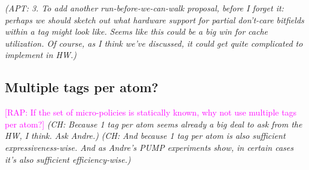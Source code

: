 \documentclass{article}
\newcommand{\comm}[3]{\textcolor{#1}{[#2: #3]}}
\newcommand{\ch}[1]{{\color{dkblue}\em (CH: #1)}}
\newcommand{\apt}[1]{{\color{red}\em (APT: #1)}}
\newcommand{\rap}[1]{\comm{magenta}{RAP}{#1}} %
\begin{document}
\apt{3. To add another run-before-we-can-walk proposal, before I forget it:
perhaps we should sketch out what hardware support for partial don't-care
bitfields within a tag might look like. Seems like this could be a big win
for cache utilization. Of course, as I think we've discussed, it could get quite
complicated to implement in HW.}

\subsection{Multiple tags per atom?}

\rap{If the set of micro-policies is statically known, why not use
  multiple tags per atom?}
%
\ch{Because 1 tag per atom seems already a big deal to ask from the
  HW, I think. Ask Andre.}
%
\ch{And because 1 tag per atom is also sufficient
  expressiveness-wise. And as Andre's PUMP experiments show, in
  certain cases it's also sufficient efficiency-wise.}
\end{document}
